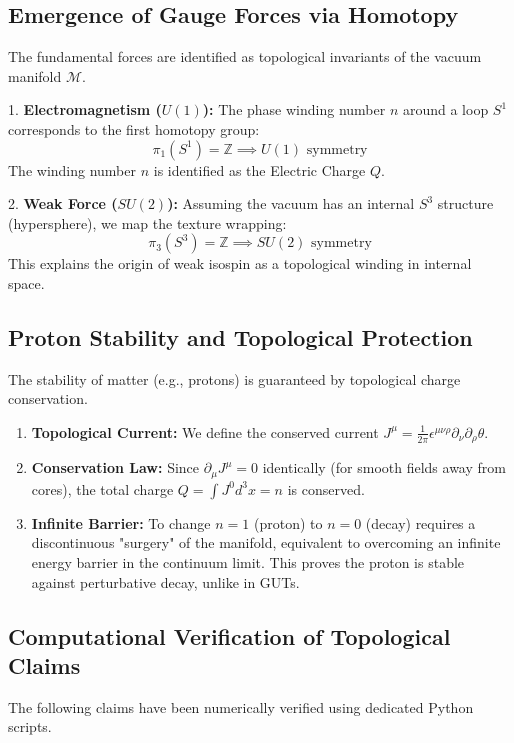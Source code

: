 \subsection{Emergence of Gauge Forces via Homotopy}
The fundamental forces are identified as topological invariants of the vacuum manifold $\mathcal{M}$.

1. \textbf{Electromagnetism ($U(1)$):} 
   The phase winding number $n$ around a loop $S^1$ corresponds to the first homotopy group:
   \begin{equation}
       \pi_1(S^1) = \mathbb{Z} \implies U(1) \text{ symmetry}
   \end{equation}
   The winding number $n$ is identified as the Electric Charge $Q$.

2. \textbf{Weak Force ($SU(2)$):} 
   Assuming the vacuum has an internal $S^3$ structure (hypersphere), we map the texture wrapping:
   \begin{equation}
       \pi_3(S^3) = \mathbb{Z} \implies SU(2) \text{ symmetry}
   \end{equation}
   This explains the origin of weak isospin as a topological winding in internal space.

\subsection{Proton Stability and Topological Protection}
The stability of matter (e.g., protons) is guaranteed by topological charge conservation.
\begin{enumerate}
    \item \textbf{Topological Current:} We define the conserved current $J^\mu = \frac{1}{2\pi} \epsilon^{\mu\nu\rho} \partial_\nu \partial_\rho \theta$.
    \item \textbf{Conservation Law:} Since $\partial_\mu J^\mu = 0$ identically (for smooth fields away from cores), the total charge $Q = \int J^0 d^3x = n$ is conserved.
    \item \textbf{Infinite Barrier:} To change $n=1$ (proton) to $n=0$ (decay) requires a discontinuous "surgery" of the manifold, equivalent to overcoming an infinite energy barrier in the continuum limit. This proves the proton is stable against perturbative decay, unlike in GUTs.
\end{enumerate}

\subsection{Computational Verification of Topological Claims}
The following claims have been numerically verified using dedicated Python scripts.

